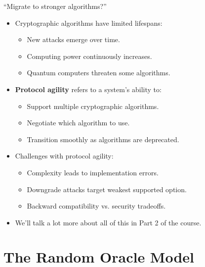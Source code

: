 \documentclass[aspectratio=169, lualatex, handout]{beamer}
\begin{document}
\begin{frame}{``Migrate to stronger algorithms?''}
	\begin{itemize}[<+->]
		\item Cryptographic algorithms have limited lifespans:
		      \begin{itemize}
			      \item New attacks emerge over time.
			      \item Computing power continuously increases.
			      \item Quantum computers threaten some algorithms.
		      \end{itemize}
		\item \textbf{Protocol agility} refers to a system's ability to:
		      \begin{itemize}
			      \item Support multiple cryptographic algorithms.
			      \item Negotiate which algorithm to use.
			      \item Transition smoothly as algorithms are deprecated.
		      \end{itemize}
		\item Challenges with protocol agility:
		      \begin{itemize}
			      \item Complexity leads to implementation errors.
			      \item Downgrade attacks target weakest supported option.
			      \item Backward compatibility vs. security tradeoffs.
		      \end{itemize}
		\item We'll talk a lot more about all of this in Part 2 of the course.
	\end{itemize}
\end{frame}

\section{The Random Oracle Model}
\end{document}
